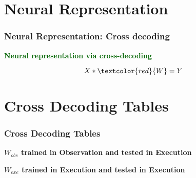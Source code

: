 \documentclass{beamer}
\begin{document}
\section{Neural Representation}

\begin{frame}
\frametitle{Neural Representation: Cross decoding}

\centering \textcolor{darkgreen}{\textbf{Neural representation via cross-decoding}}

\begin{equation}\label{eq:linearReg2}
    X*\textcolor{red}{W}=Y
\end{equation}
\begin{center}


\end{center}
\end{frame}


\section{Cross Decoding Tables}

\begin{frame}
\frametitle{Cross Decoding Tables}
 \textbf{$W_{obs}$ trained in Observation and tested in Execution}\\
\begin{center}
\end{center}
\textbf{$W_{exe}$  trained in Execution and tested in Execution}\\
\begin{center}
\end{center}

\end{frame}
\end{document}

